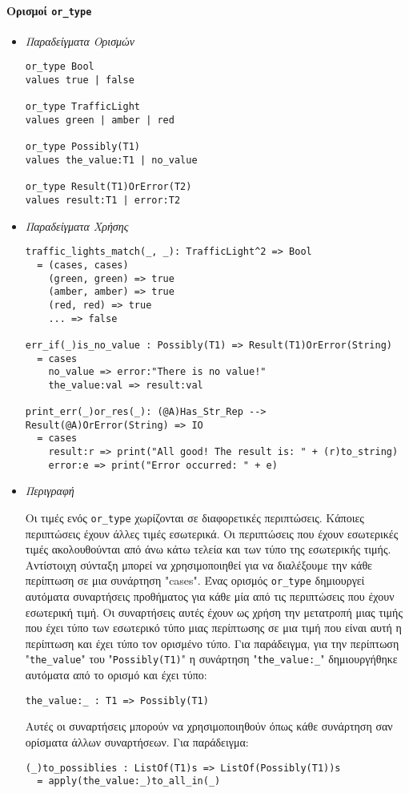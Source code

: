 \documentclass[diploma]{softlab-thesis}
\begin{document}
\newpage

\paragraph{Ορισμοί \texttt{or_type}}

\begin{itemize}
\item \textit{Παραδείγματα Ορισμών}

\begin{verbatim}
or_type Bool
values true | false

or_type TrafficLight
values green | amber | red

or_type Possibly(T1)
values the_value:T1 | no_value

or_type Result(T1)OrError(T2)
values result:T1 | error:T2
\end{verbatim}

\item \textit{Παραδείγματα Χρήσης}

\begin{verbatim}
traffic_lights_match(_, _): TrafficLight^2 => Bool
  = (cases, cases)
    (green, green) => true
    (amber, amber) => true
    (red, red) => true
    ... => false

err_if(_)is_no_value : Possibly(T1) => Result(T1)OrError(String)
  = cases
    no_value => error:"There is no value!"
    the_value:val => result:val

print_err(_)or_res(_): (@A)Has_Str_Rep --> Result(@A)OrError(String) => IO
  = cases
    result:r => print("All good! The result is: " + (r)to_string)
    error:e => print("Error occurred: " + e)
\end{verbatim}

\item \textit{Περιγραφή}

Οι τιμές ενός \verb|or_type| χωρίζονται σε διαφορετικές περιπτώσεις. Κάποιες
περιπτώσεις έχουν άλλες τιμές εσωτερικά. Οι περιπτώσεις που έχουν εσωτερικές
τιμές ακολουθούνται από άνω κάτω τελεία και των τύπο της εσωτερικής τιμής.
Αντίστοιχη σύνταξη μπορεί να χρησιμοποιηθεί για να διαλέξουμε την κάθε
περίπτωση σε μια συνάρτηση "cases". Ένας ορισμός \verb|or_type| δημιουργεί
αυτόματα συναρτήσεις προθήματος για κάθε μία από τις περιπτώσεις που έχουν
εσωτερική τιμή. Οι συναρτήσεις αυτές έχουν ως χρήση την μετατροπή μιας
τιμής που έχει τύπο των εσωτερικό τύπο μιας περίπτωσης σε μια τιμή που είναι
αυτή η περίπτωση και έχει τύπο τον ορισμένο τύπο. Για παράδειγμα, για την
περίπτωση "\verb|the_value|" του "\verb|Possibly(T1)|" η συνάρτηση
"\verb|the_value:_|" δημιουργήθηκε αυτόματα από το ορισμό και έχει τύπο:
\begin{verbatim}
the_value:_ : T1 => Possibly(T1)
\end{verbatim}
Αυτές οι συναρτήσεις μπορούν να χρησιμοποιηθούν όπως κάθε συνάρτηση σαν
ορίσματα άλλων συναρτήσεων. Για παράδειγμα:
\begin{verbatim}
(_)to_possiblies : ListOf(T1)s => ListOf(Possibly(T1))s
  = apply(the_value:_)to_all_in(_)
\end{verbatim}

\end{itemize}
\end{document}
